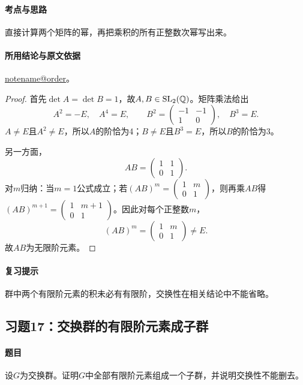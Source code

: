 \documentclass[UTF8,a4paper,11pt,fontset=windows]{ctexart}
\makeatletter
\newcommand{\noteref}[1]{\hyperref[note:#1]{\csname notename@#1\endcsname}}
\newcommand{\exref}[2]{\hyperref[ex:#1:#2]{第#1章习题#2}}
\makeatother
\begin{document}
\paragraph{考点与思路}
直接计算两个矩阵的幂，再把乘积的所有正整数次幂写出来。

\paragraph{所用结论与原文依据}
\noteref{order}。


\begin{proof}
首先$\det A=\det B=1$，故$A,B\in\operatorname{SL}_2(\mathbb Q)$。矩阵乘法给出
\[
A^2=-E,\quad A^4=E,\qquad
B^2=\begin{pmatrix}-1&-1\\1&0\end{pmatrix},\quad B^3=E.
\]
$A\ne E$且$A^2\ne E$，所以$A$的阶恰为4；$B\ne E$且$B^3=E$，所以$B$的阶恰为3。

另一方面，
\[
AB=\begin{pmatrix}1&1\\0&1\end{pmatrix}.
\]
对$m$归纳：当$m=1$公式成立；若$(AB)^m=\left(\begin{smallmatrix}1&m\\0&1\end{smallmatrix}\right)$，则再乘$AB$得$(AB)^{m+1}=\left(\begin{smallmatrix}1&m+1\\0&1\end{smallmatrix}\right)$。因此对每个正整数$m$，
\[
(AB)^m=\begin{pmatrix}1&m\\0&1\end{pmatrix}\ne E.
\]
故$AB$为无限阶元素。
\end{proof}

\paragraph{复习提示}
群中两个有限阶元素的积未必有有限阶，交换性在相关结论中不能省略。


\subsection{习题17：\texorpdfstring{交换群的有限阶元素成子群}{交换群的有限阶元素成子群}}
\label{ex:1:17}

\paragraph{题目}
设$G$为交换群。证明$G$中全部有限阶元素组成一个子群，并说明交换性不能删去。
\end{document}
